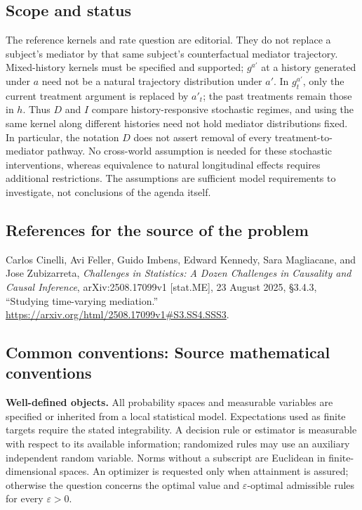 \documentclass[11pt,a4paper]{article}
\begin{document}
\subsection*{Scope and status}
The reference kernels and rate question are editorial. They do not replace a subject's mediator by that same subject's counterfactual mediator trajectory. Mixed-history kernels must be specified and supported; $g^{a'}$ at a history generated under $a$ need not be a natural trajectory distribution under $a'$. In $g_t^{a'}$, only the current treatment argument is replaced by $a'_t$; the past treatments remain those in $h$. Thus $D$ and $I$ compare history-responsive stochastic regimes, and using the same kernel along different histories need not hold mediator distributions fixed. In particular, the notation $D$ does not assert removal of every treatment-to-mediator pathway. No cross-world assumption is needed for these stochastic interventions, whereas equivalence to natural longitudinal effects requires additional restrictions. The assumptions are sufficient model requirements to investigate, not conclusions of the agenda itself.
\subsection*{References for the source of the problem}
Carlos Cinelli, Avi Feller, Guido Imbens, Edward Kennedy, Sara Magliacane, and Jose Zubizarreta, \emph{Challenges in Statistics: A Dozen Challenges in Causality and Causal Inference}, arXiv:2508.17099v1 [stat.ME], 23 August 2025, \S3.4.3, ``Studying time-varying mediation.'' \url{https://arxiv.org/html/2508.17099v1#S3.SS4.SSS3}.

\subsection*{Common conventions: Source mathematical conventions}

\textbf{Well-defined objects.}
All probability spaces and measurable variables are specified or inherited
from a local statistical model. Expectations used as finite targets require
the stated integrability. A decision rule or estimator is measurable with
respect to its available information; randomized rules may use an auxiliary
independent random variable. Norms without a subscript are Euclidean in
finite-dimensional spaces. An optimizer is requested only when attainment
is assured; otherwise the question concerns the optimal value and
$\varepsilon$-optimal admissible rules for every $\varepsilon>0$.
\end{document}
